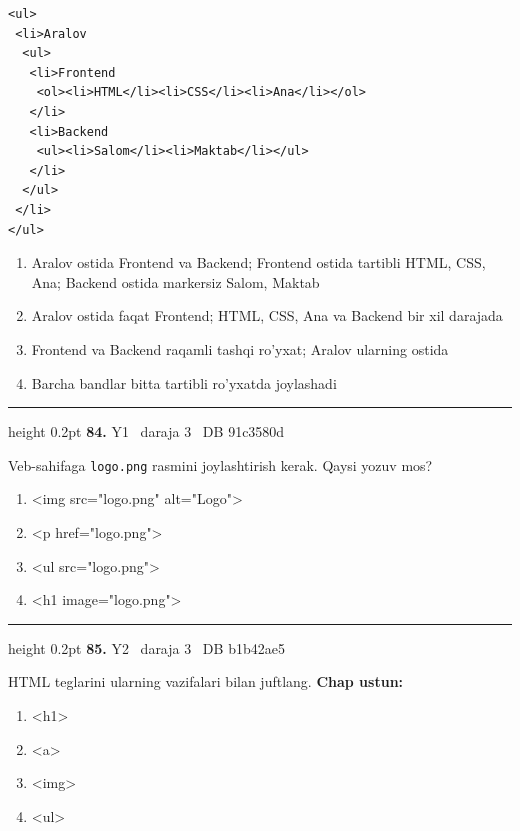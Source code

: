 \documentclass[10pt,a4paper,oneside]{article}
\begin{document}
\par
\begin{lstlisting}
<ul>
 <li>Aralov
  <ul>
   <li>Frontend
    <ol><li>HTML</li><li>CSS</li><li>Ana</li></ol>
   </li>
   <li>Backend
    <ul><li>Salom</li><li>Maktab</li></ul>
   </li>
  </ul>
 </li>
</ul>
\end{lstlisting}

\begin{enumerate}[label=\Alph*),leftmargin=9mm]
\item Aralov ostida Frontend va Backend; Frontend ostida tartibli HTML, CSS, Ana; Backend ostida markersiz Salom, Maktab
\item Aralov ostida faqat Frontend; HTML, CSS, Ana va Backend bir xil darajada
\item Frontend va Backend raqamli tashqi ro'yxat; Aralov ularning ostida
\item Barcha bandlar bitta tartibli ro'yxatda joylashadi
\end{enumerate}
\vspace{2mm}\hrule height 0.2pt \vspace{4mm}
\hypertarget{q84}{\textbf{\color{ink}84.}}  {\color{muted}\scriptsize Y1 \textbullet\ daraja 3 \textbullet\ DB 91c3580d}
\par
Veb-sahifaga \texttt{logo.png} rasmini joylashtirish kerak. Qaysi yozuv mos?
\begin{enumerate}[label=\Alph*),leftmargin=9mm]
\item \textless{}img src="logo.png" alt="Logo"\textgreater{}
\item \textless{}p href="logo.png"\textgreater{}
\item \textless{}ul src="logo.png"\textgreater{}
\item \textless{}h1 image="logo.png"\textgreater{}
\end{enumerate}
\vspace{2mm}\hrule height 0.2pt \vspace{4mm}
\hypertarget{q85}{\textbf{\color{ink}85.}}  {\color{muted}\scriptsize Y2 \textbullet\ daraja 3 \textbullet\ DB b1b42ae5}
\par
HTML teglarini ularning vazifalari bilan juftlang.
\textbf{\footnotesize Chap ustun:}
\begin{enumerate}[label=\arabic*),leftmargin=9mm]
\item \textless{}h1\textgreater{}
\item \textless{}a\textgreater{}
\item \textless{}img\textgreater{}
\item \textless{}ul\textgreater{}
\end{enumerate}
\end{document}
